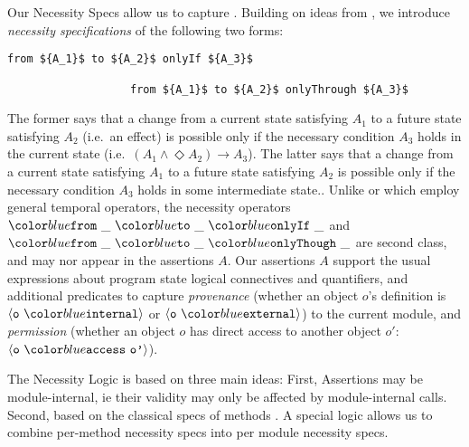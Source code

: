  
Our Necessity Specs allow us to capture .  
Building on ideas from \citeauthor{FASE},  
 we introduce
\textit{necessity specifications} of the following two forms:
%
%
%
%
\begin{lstlisting}[mathescape=true, language=chainmail, frame=lines]
                   from ${A_1}$ to ${A_2}$ onlyIf ${A_3}$ 
                    
                   from ${A_1}$ to ${A_2}$ onlyThrough ${A_3}$
\end{lstlisting}
%
The former says that  a change from a current state satisfying $A_1$ to a future
state satisfying $A_2$ (i.e.\ an effect) is possible only if the necessary condition
$A_3$ holds in the current state
%
(i.e.\ $(A_1 \wedge \Diamond A_2) \longrightarrow A_3$).
The latter says that a change from a current state satisfying $A_1$ to a future
state satisfying $A_2$  is possible only if the necessary condition
$A_3$ holds in some intermediate state..
Unlike \citeauthor{VerX} or \citeauthor{FASE}
which employ general temporal operators, 
the necessity operators $\onlyIf {\_} {\_} {\_}$  and $\onlyThrough {\_} {\_} {\_}$
are second class, and may nor appear in the assertions $A$.
%
%
%
Our assertions $A$ support the usual expressions about program state
 logical connectives and quantifiers, 
and additional predicates
to capture \textit{provenance} (whether an object $o$'s definition is
$\internal{\texttt{o}}$ or $\external{\texttt{o}}$) to the current
module, and \textit{permission} \cite{miller-esop2013} (whether an
object $o$ has direct access to another object $o'$:
$\access{\texttt{o}}{\texttt{o'}}$).
 
The Necessity Logic is based on three main ideas: 
First, Assertions may be module-internal, ie
their validity may only be affected by module-internal calls. 
Second, based on the classical specs of methods 
.
A special logic allows us to combine per-method necessity specs into per
module necessity specs.

